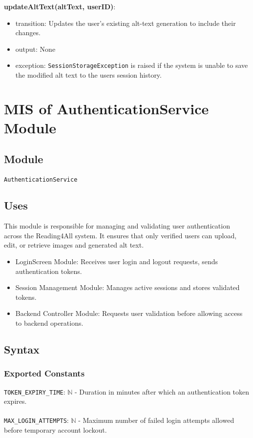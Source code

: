 \documentclass[12pt, titlepage]{article}
\begin{document}
\noindent \textbf{updateAltText(altText, userID)}:
\begin{itemize}
  \item transition: Updates the user's existing alt-text generation
    to include their changes.
  \item output:  None
  \item exception: \texttt{SessionStorageException} is raised if the
    system is unable to save the modified alt text to the users session history.
\end{itemize}

\section{MIS of AuthenticationService Module}
\label{Module:AuthenticationService}

\subsection{Module}

\texttt{AuthenticationService}

\subsection{Uses}
This module is responsible for managing and validating user
authentication across the Reading4All system. It ensures that only
verified users can upload, edit, or retrieve images and generated alt text.
\begin{itemize}
  \item LoginScreen Module: Receives user login and logout requests,
    sends authentication tokens.
  \item Session Management Module: Manages active sessions and stores
    validated tokens.
  \item Backend Controller Module: Requests user validation before
    allowing access to backend operations.
\end{itemize}

\subsection{Syntax}

\subsubsection{Exported Constants}
\texttt{TOKEN\_EXPIRY\_TIME}: $\mathbb{N}$ - Duration in minutes
after which an authentication token expires. \\ \\
\texttt{MAX\_LOGIN\_ATTEMPTS}: $\mathbb{N}$ - Maximum number of
failed login attempts allowed before temporary account lockout. \\
\end{document}
